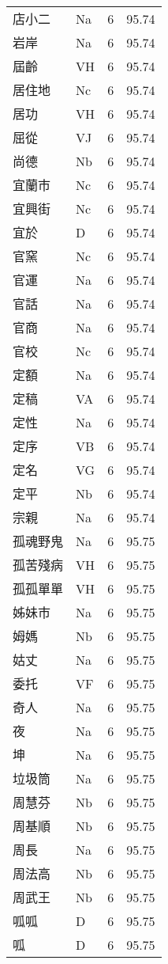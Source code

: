 \documentclass[twocolumn]{book}
\begin{document}
\begin{supertabular}{llrr}
店小二 & Na & 6 &  95.74\\
岩岸 & Na & 6 &  95.74\\
屆齡 & VH & 6 &  95.74\\
居住地 & Nc & 6 &  95.74\\
居功 & VH & 6 &  95.74\\
屈從 & VJ & 6 &  95.74\\
尚德 & Nb & 6 &  95.74\\
宜蘭市 & Nc & 6 &  95.74\\
宜興街 & Nc & 6 &  95.74\\
宜於 & D & 6 &  95.74\\
官窯 & Nc & 6 &  95.74\\
官運 & Na & 6 &  95.74\\
官話 & Na & 6 &  95.74\\
官商 & Na & 6 &  95.74\\
官校 & Nc & 6 &  95.74\\
定額 & Na & 6 &  95.74\\
定稿 & VA & 6 &  95.74\\
定性 & Na & 6 &  95.74\\
定序 & VB & 6 &  95.74\\
定名 & VG & 6 &  95.74\\
定平 & Nb & 6 &  95.74\\
宗親 & Na & 6 &  95.74\\
孤魂野鬼 & Na & 6 &  95.75\\
孤苦殘病 & VH & 6 &  95.75\\
孤孤單單 & VH & 6 &  95.75\\
姊妹市 & Na & 6 &  95.75\\
姆媽 & Nb & 6 &  95.75\\
姑丈 & Na & 6 &  95.75\\
委托 & VF & 6 &  95.75\\
奇人 & Na & 6 &  95.75\\
夜 & Na & 6 &  95.75\\
坤 & Na & 6 &  95.75\\
垃圾筒 & Na & 6 &  95.75\\
周慧芬 & Nb & 6 &  95.75\\
周基順 & Nb & 6 &  95.75\\
周長 & Na & 6 &  95.75\\
周法高 & Nb & 6 &  95.75\\
周武王 & Nb & 6 &  95.75\\
呱呱 & D & 6 &  95.75\\
呱 & D & 6 &  95.75\\

\end{supertabular}
\end{document}
